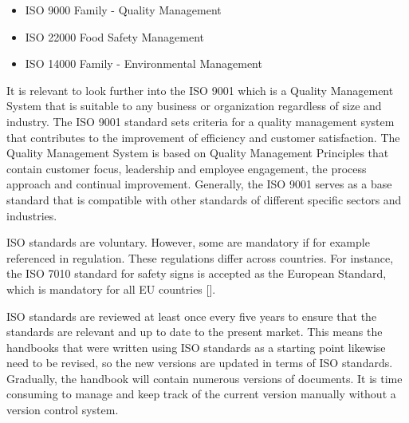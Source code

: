\begin{itemize}
	\item ISO 9000 Family - Quality Management
	\item ISO 22000 Food Safety Management
	\item ISO 14000 Family - Environmental Management
\end{itemize}

It is relevant to look further into the ISO 9001 which is a Quality Management System that is suitable to any business or organization regardless of size and industry. The ISO 9001 standard sets criteria for a quality management system that contributes to the improvement of efficiency and customer satisfaction. The Quality Management System is based on Quality Management Principles that contain customer focus, leadership and employee engagement, the process approach and continual improvement. Generally, the ISO 9001 serves as a base standard that is compatible with other standards of different specific sectors and industries.

ISO standards are voluntary. However, some are mandatory if for example referenced in regulation. These regulations differ across countries. For instance, the ISO 7010 standard for safety signs is accepted as the European Standard, which is mandatory for all EU countries [].

ISO standards are reviewed at least once every five years to ensure that the standards are relevant and up to date to the present market. This means the handbooks that were written using ISO standards as a starting point likewise need to be revised, so the new versions are updated in terms of ISO standards. Gradually, the handbook will contain numerous versions of documents. It is time consuming to manage and keep track of the current version manually without a version control system.
